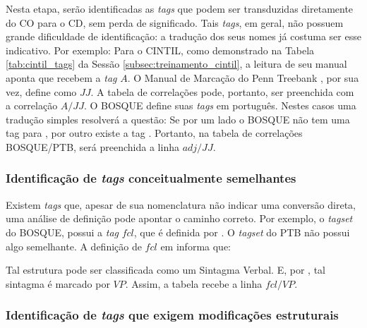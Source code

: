 Nesta etapa, serão identificadas as \textit{tags} que podem ser transduzidas diretamente do CO para o CD, sem perda de significado. Tais \textit{tags}, em geral, não possuem grande dificuldade de identificação: a tradução dos seus nomes já costuma ser esse indicativo. Por exemplo: Para o CINTIL, como demonstrado na Tabela \ref{tab:cintil_tags} da Sessão \ref{subsec:treinamento_cintil}, a leitura de seu manual \cite[p~4]{cintil_handbook} aponta que  recebem a \textit{tag} $A$. O Manual de Marcação do Penn Treebank \cite[p~1]{posPTBguidelines}, por sua vez, define  como $JJ$. A tabela de correlações pode, portanto, ser preenchida com a correlação $A / JJ$. O BOSQUE define suas \textit{tags} em português. Nestes casos uma tradução simples resolverá a questão: Se por um lado o BOSQUE não tem uma tag para , por outro existe a tag . Portanto, na tabela de correlações BOSQUE/PTB, será preenchida a linha $adj / JJ$.

\subsubsection{Identificação de \textit{tags} conceitualmente semelhantes}
\label{subsubsec:tags_conceit_semelhantes}

Existem \textit{tags} que, apesar de sua nomenclatura não indicar uma conversão direta, uma análise de definição pode apontar o caminho correto. Por exemplo, o \textit{tagset} do BOSQUE, possui a \textit{tag} $fcl$, que é definida por . O \textit{tagset} do PTB não possui algo semelhante. A definição de $fcl$ em \cite[p~12]{afonso2006arvores} informa que:

\begin{quote}
\end{quote}

Tal estrutura pode ser classificada como um Sintagma Verbal. E, por \cite[p~321]{buildingPTB}, tal sintagma é marcado por $VP$. Assim, a tabela recebe a linha $fcl / VP$.

\subsubsection{Identificação de \textit{tags} que exigem modificações estruturais}
\label{subsubsec:tags_mudancas_estruturais}

